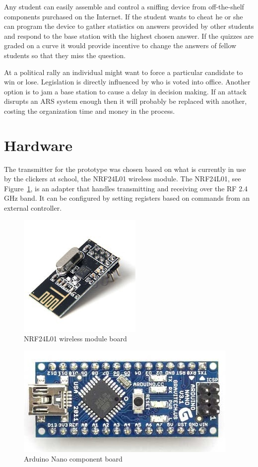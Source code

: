 Any student can easily assemble and control a sniffing device from off-the-shelf components purchased on the Internet.  If the student wants to cheat he or she can program the device to gather statistics on answers provided by other students and respond to the base station with the highest chosen answer.  If the quizzes are graded on a curve it would provide incentive to change the answers of fellow students so that they miss the question.

At a political rally an individual might want to force a particular candidate to win or lose.  Legislation is directly influenced by who is voted into office. Another option is to jam a base station to cause a delay in decision making.  If an attack disrupts an ARS system enough then it will probably be replaced with another, costing the organization time and money in the process.

\section{Hardware}
The transmitter for the prototype was chosen based on what is currently in use by the clickers at school, the NRF24L01 wireless module.  The NRF24L01, see Figure~\ref{img:wirelessAdapter}, is an adapter that handles transmitting and receiving over the RF 2.4 GHz band.  It can be configured by setting registers based on commands from an external controller.

\begin{figure}[h]
\centering
  \includegraphics[scale=.6]{images/wirelessAdapter}
    \caption{NRF24L01 wireless module board~\cite{wirelessAdapterPhoto}}
	\label{img:wirelessAdapter}
\end{figure}

\begin{figure}[h]
\centering
  \includegraphics[scale=.6]{images/arduinoNano}
    \caption{Arduino Nano component board~\cite{ArduinoNanoPhoto}}
	\label{img:arduinoNano}
\end{figure}

